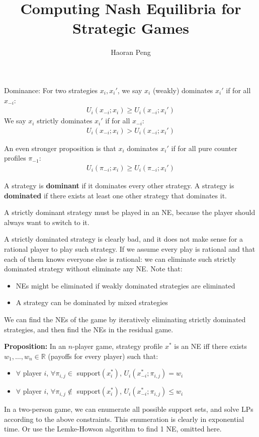 \documentclass{article}
\begin{document}
	\title{Computing Nash Equilibria for Strategic Games}
	\author{Haoran Peng}
	\maketitle

Dominance: For two strategies $x_i, x_i'$, we say $x_i$ (weakly) dominates $x_i'$ if for all $x_{-i}$:
\begin{align*}
U_i(x_{-i}; x_i) \ge U_i(x_{-i}; x_i')
\end{align*}
We say $x_i$ strictly dominates $x_i'$ if for all $x_{-i}$:
\begin{align*}
	U_i(x_{-i}; x_i) > U_i(x_{-i}; x_i')
\end{align*}

An even stronger proposition is that $x_i$ dominates $x_i'$ if for all pure counter profiles $\pi_{-1}$:
\begin{align*}
	U_i(\pi_{-i}; x_i) \ge U_i(\pi_{-i}; x_i')
\end{align*}

A strategy  is \textbf{dominant} if it dominates every other strategy. A strategy is \textbf{dominated} if there exists at least one other strategy that dominates it.

A strictly dominant strategy must be played in an NE, because the player should always want to switch to it.

A strictly dominated strategy is clearly bad, and it does not make sense for a rational player to play such strategy. If we assume every play is rational and that each of them knows everyone else is rational: we can eliminate such strictly dominated strategy without eliminate any NE. Note that:
\begin{itemize}
\item NEs might be eliminated if weakly dominated strategies are eliminated
\item A strategy can be dominated by mixed strategies
\end{itemize}

We can find the NEs of the game by iteratively eliminating strictly dominated strategies, and then find the NEs in the residual game.

\newpage
\textbf{Proposition: } In an $n$-player game, strategy profile $x^*$ is an NE iff there exists $w_1,\ldots,w_n \in \mathbb{R}$ (payoffs for every player) such that:
\begin{itemize}
\item $\forall$ player $i$, $\forall \pi_{i,j} \in$ support$(x^*_i)$, $U_i(x^*_{-i}; \pi_{i,j}) = w_i$
\item $\forall$ player $i$, $\forall \pi_{i,j} \notin$ support$(x^*_i)$, $U_i(x^*_{-i}; \pi_{i,j}) \le w_i$
\end{itemize}

In a two-person game, we can enumerate all possible support sets, and solve LPs according to the above constraints. This enumeration is clearly in exponential time. Or use the Lemke-Howson algorithm to find 1 NE, omitted here.
\end{document}

